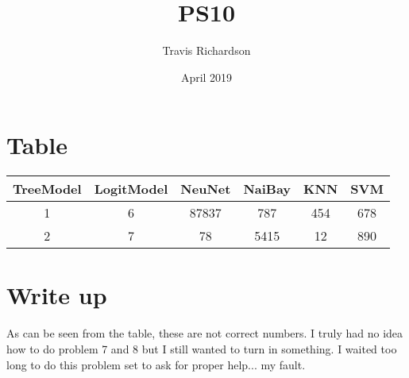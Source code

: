 \documentclass{article}
\title{PS10}
\author{Travis Richardson }
\date{April 2019}
\begin{document}
\maketitle

\section{Table}

\begin{center}
 \begin{tabular}{||c c c c c c||} 
 \hline
 TreeModel & LogitModel & NeuNet & NaiBay & KNN & SVM \\ [0.5ex] 
 \hline\hline
 1 & 6 & 87837 & 787 & 454 & 678 \\ 
 \hline
 2 & 7 & 78 & 5415 & 12 & 890\\

 \hline
\end{tabular}
\end{center}


\section{Write up}
As can be seen from the table, these are not correct numbers. I truly had no idea how to do problem 7 and 8 but I still wanted to turn in something. I waited too long to do this problem set to ask for proper help... my fault. 
\end{document}
